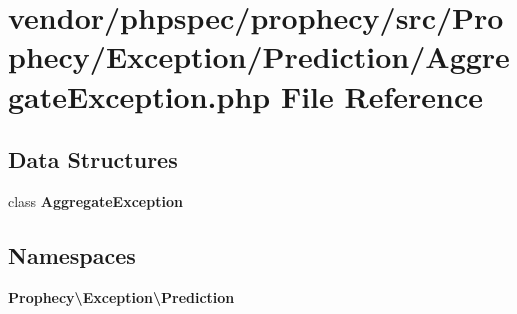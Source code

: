 \section{vendor/phpspec/prophecy/src/\+Prophecy/\+Exception/\+Prediction/\+Aggregate\+Exception.php File Reference}
\label{_aggregate_exception_8php}
\subsection*{Data Structures}
\begin{DoxyCompactItemize}
\item 
class {\bf Aggregate\+Exception}
\end{DoxyCompactItemize}
\subsection*{Namespaces}
\begin{DoxyCompactItemize}
\item 
 {\bf Prophecy\textbackslash{}\+Exception\textbackslash{}\+Prediction}
\end{DoxyCompactItemize}
